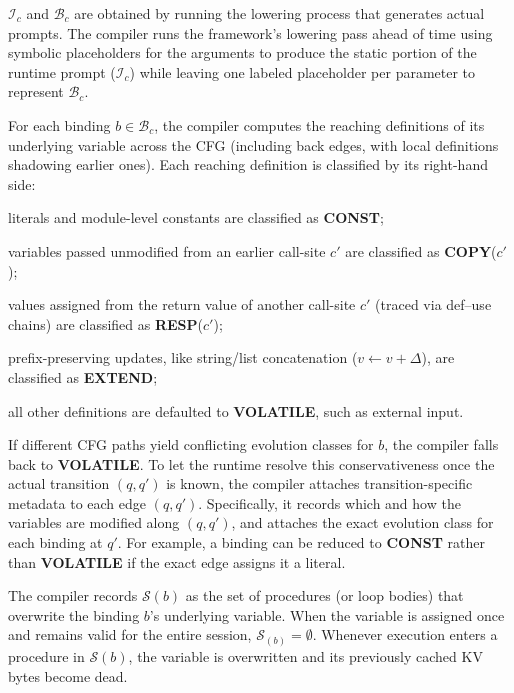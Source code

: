 $\mathcal{I}_c$ and $\mathcal{B}_c$ are obtained by running the lowering process that generates actual prompts. The compiler runs the framework's lowering pass ahead of time using symbolic placeholders for the arguments to produce the static portion of the runtime prompt ($\mathcal{I}_c$) while leaving one labeled placeholder per parameter to represent $\mathcal{B}_c$.

For each binding $b \in \mathcal{B}_c$, the compiler computes the reaching definitions of its underlying variable across the CFG (including back edges, with local definitions shadowing earlier ones). Each reaching definition is classified by its right-hand side:
\begin{enumerate*}[label=(\roman*)]
    \item literals and module-level constants are classified as \textbf{CONST};
    \item variables passed unmodified from an earlier call-site $c'$ are classified as \textbf{COPY}($c'$);
    \item values assigned from the return value of another call-site $c'$ (traced via def--use chains) are classified as \textbf{RESP}($c'$);
    \item prefix-preserving updates, like string/list concatenation ($v \leftarrow v + \Delta$), are classified as \textbf{EXTEND};
    \item all other definitions are defaulted to \textbf{VOLATILE}, such as external input.
\end{enumerate*}

If different CFG paths yield conflicting evolution classes for $b$, the compiler falls back to \textbf{VOLATILE}. To let the runtime resolve this conservativeness once the actual transition $(q, q')$ is known, the compiler attaches transition-specific metadata to each edge $(q, q')$. Specifically, it records which and how the variables are modified along $(q,q')$, and attaches the exact evolution class for each binding at $q'$. For example, a binding can be reduced to \textbf{CONST} rather than \textbf{VOLATILE} if the exact edge assigns it a literal.


The compiler records $\mathcal{S}(b)$ as the set of procedures (or loop bodies) that overwrite the binding $b$'s underlying variable. When the variable is assigned once and remains valid for the entire session, $\mathcal{S}_(b)=\emptyset$. Whenever execution enters a procedure in $\mathcal{S}(b)$, the variable is overwritten and its previously cached KV bytes become dead.

